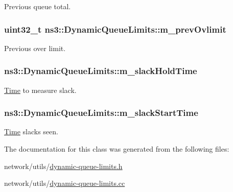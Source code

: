 Previous queue total. 

\subsubsection[{\texorpdfstring{m\+\_\+prev\+Ovlimit}{m_prevOvlimit}}]{\setlength{\rightskip}{0pt plus 5cm}uint32\+\_\+t ns3\+::\+Dynamic\+Queue\+Limits\+::m\+\_\+prev\+Ovlimit\hspace{0.3cm}{\ttfamily [private]}}\hypertarget{classns3_1_1DynamicQueueLimits_a63d5c451bd659754d9968445e5c3a1b9}{}\label{classns3_1_1DynamicQueueLimits_a63d5c451bd659754d9968445e5c3a1b9}


Previous over limit. 

\subsubsection[{\texorpdfstring{m\+\_\+slack\+Hold\+Time}{m_slackHoldTime}}]{ ns3\+::\+Dynamic\+Queue\+Limits\+::m\+\_\+slack\+Hold\+Time\hspace{0.3cm}{\ttfamily [private]}}\hypertarget{classns3_1_1DynamicQueueLimits_a788650e71ce18f137b3620a8659eeda3}{}\label{classns3_1_1DynamicQueueLimits_a788650e71ce18f137b3620a8659eeda3}


\hyperlink{classns3_1_1Time}{Time} to measure slack. 

\subsubsection[{\texorpdfstring{m\+\_\+slack\+Start\+Time}{m_slackStartTime}}]{ ns3\+::\+Dynamic\+Queue\+Limits\+::m\+\_\+slack\+Start\+Time\hspace{0.3cm}{\ttfamily [private]}}\hypertarget{classns3_1_1DynamicQueueLimits_a4e63a333752db6ccdaa6c232c4f5433b}{}\label{classns3_1_1DynamicQueueLimits_a4e63a333752db6ccdaa6c232c4f5433b}


\hyperlink{classns3_1_1Time}{Time} slacks seen. 



The documentation for this class was generated from the following files\+:\begin{DoxyCompactItemize}
\item 
network/utils/\hyperlink{dynamic-queue-limits_8h}{dynamic-\/queue-\/limits.\+h}\item 
network/utils/\hyperlink{dynamic-queue-limits_8cc}{dynamic-\/queue-\/limits.\+cc}\end{DoxyCompactItemize}
